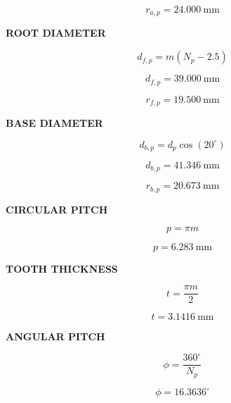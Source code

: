 \documentclass{article}
\begin{document}
\begin{equation}
r_{a,p} = 24.000\ \mathrm{mm}
\end{equation}

\textbf{ROOT DIAMETER}

\begin{equation}
d_{f,p} = m(N_p-2.5)
\end{equation}

\begin{equation}
d_{f,p} = 39.000\ \mathrm{mm}
\end{equation}

\begin{equation}
r_{f,p} = 19.500\ \mathrm{mm}
\end{equation}

\textbf{BASE DIAMETER}

\begin{equation}
d_{b,p} = d_p\cos(20^\circ)
\end{equation}

\begin{equation}
d_{b,p} = 41.346\ \mathrm{mm}
\end{equation}

\begin{equation}
r_{b,p} = 20.673\ \mathrm{mm}
\end{equation}

\textbf{CIRCULAR PITCH}

\begin{equation}
p = \pi m
\end{equation}

\begin{equation}
p = 6.283\ \mathrm{mm}
\end{equation}

\textbf{TOOTH THICKNESS}

\begin{equation}
t = \frac{\pi m}{2}
\end{equation}

\begin{equation}
t = 3.1416\ \mathrm{mm}
\end{equation}

\textbf{ANGULAR PITCH}

\begin{equation}
\phi = \frac{360^\circ}{N_p}
\end{equation}

\begin{equation}
\phi = 16.3636^\circ
\end{equation}
\end{document}
